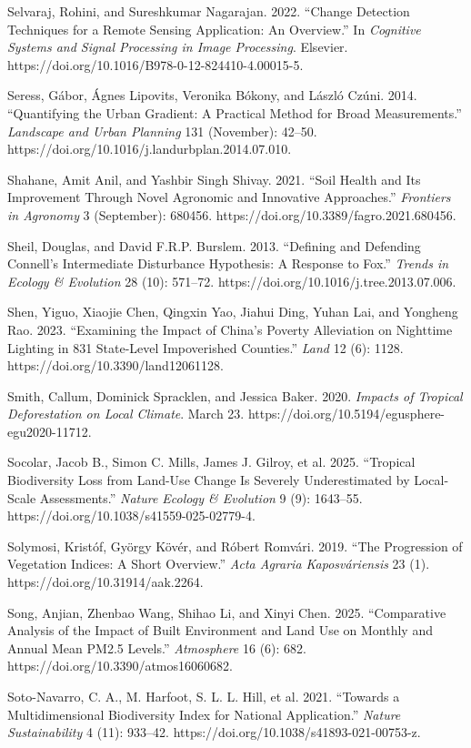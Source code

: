 Selvaraj, Rohini, and Sureshkumar Nagarajan. 2022. ``Change Detection Techniques for a Remote Sensing Application: An Overview.'' In \emph{Cognitive Systems and Signal Processing in Image Processing}. Elsevier. https://doi.org/10.1016/B978-0-12-824410-4.00015-5.

Seress, Gábor, Ágnes Lipovits, Veronika Bókony, and László Czúni. 2014. ``Quantifying the Urban Gradient: A Practical Method for Broad Measurements.'' \emph{Landscape and Urban Planning} 131 (November): 42--50. https://doi.org/10.1016/j.landurbplan.2014.07.010.

Shahane, Amit Anil, and Yashbir Singh Shivay. 2021. ``Soil Health and Its Improvement Through Novel Agronomic and Innovative Approaches.'' \emph{Frontiers in Agronomy} 3 (September): 680456. https://doi.org/10.3389/fagro.2021.680456.

Sheil, Douglas, and David F.R.P. Burslem. 2013. ``Defining and Defending Connell's Intermediate Disturbance Hypothesis: A Response to Fox.'' \emph{Trends in Ecology \& Evolution} 28 (10): 571--72. https://doi.org/10.1016/j.tree.2013.07.006.

Shen, Yiguo, Xiaojie Chen, Qingxin Yao, Jiahui Ding, Yuhan Lai, and Yongheng Rao. 2023. ``Examining the Impact of China's Poverty Alleviation on Nighttime Lighting in 831 State-Level Impoverished Counties.'' \emph{Land} 12 (6): 1128. https://doi.org/10.3390/land12061128.

Smith, Callum, Dominick Spracklen, and Jessica Baker. 2020. \emph{Impacts of Tropical Deforestation on Local Climate}. March 23. https://doi.org/10.5194/egusphere-egu2020-11712.

Socolar, Jacob B., Simon C. Mills, James J. Gilroy, et al. 2025. ``Tropical Biodiversity Loss from Land-Use Change Is Severely Underestimated by Local-Scale Assessments.'' \emph{Nature Ecology \& Evolution} 9 (9): 1643--55. https://doi.org/10.1038/s41559-025-02779-4.

Solymosi, Kristóf, György Kövér, and Róbert Romvári. 2019. ``The Progression of Vegetation Indices: A Short Overview.'' \emph{Acta Agraria Kaposváriensis} 23 (1). https://doi.org/10.31914/aak.2264.

Song, Anjian, Zhenbao Wang, Shihao Li, and Xinyi Chen. 2025. ``Comparative Analysis of the Impact of Built Environment and Land Use on Monthly and Annual Mean PM2.5 Levels.'' \emph{Atmosphere} 16 (6): 682. https://doi.org/10.3390/atmos16060682.

Soto-Navarro, C. A., M. Harfoot, S. L. L. Hill, et al. 2021. ``Towards a Multidimensional Biodiversity Index for National Application.'' \emph{Nature Sustainability} 4 (11): 933--42. https://doi.org/10.1038/s41893-021-00753-z.

